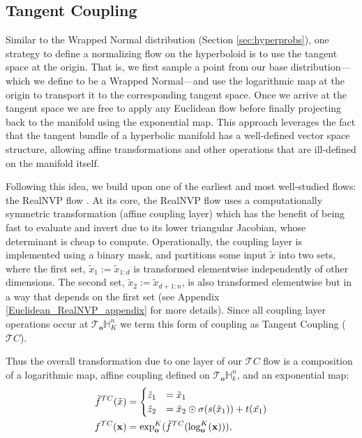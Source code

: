\subsection{Tangent Coupling}
Similar to the Wrapped Normal distribution (Section \ref{sec:hyperprobs}), one strategy to define a normalizing flow on the hyperboloid is to use the tangent space at the origin. That is, we first sample a point from our base distribution---which we define to be a Wrapped Normal---and use the logarithmic map at the origin to transport it to the corresponding tangent space. Once we arrive at the tangent space we are free to apply any Euclidean flow before finally projecting back to the manifold using the exponential map. 
This approach leverages the fact that the tangent bundle of a hyperbolic manifold has a well-defined vector space structure, allowing affine transformations and other operations that are ill-defined on the manifold itself. 

Following this idea, we build upon one of the earliest and most well-studied flows: the RealNVP flow \cite{dinh2016density}. At its core, the RealNVP flow uses a computationally symmetric transformation (affine coupling layer) which has the benefit of being fast to evaluate and invert due to its lower triangular Jacobian, whose determinant is cheap to compute. Operationally, the coupling layer is implemented using a binary mask, and partitions some input $\tilde{x}$ into two sets, where the first set, $\tilde{x}_1:=\tilde{x}_{1:d}$ is transformed elementwise independently of other dimensions. The second set, $\tilde{x}_2:=\tilde{x}_{d+1:n}$, is also transformed elementwise but in a way that depends on the first set (see Appendix \ref{Euclidean_RealNVP_appendix} for more details). Since all coupling layer operations occur at $\mathcal{T}_{\textbf{o}}\mathbb{H}^n_K$ we term this form of coupling as Tangent Coupling ($\mathcal{T}C$). 

Thus the overall transformation due to one layer of our $\mathcal{T}C$ flow is a composition of a logarithmic map, affine coupling defined on $\mathcal{T}_{\textbf{o}}\mathbb{H}^n_k$, and an exponential map:
\begin{align}
    \label{eq:tangent_coupling}
     \tilde{f}^{\mathcal{T}C}(\tilde{x}) &=
     \begin{cases}
     \tilde{z}_{1} &= \tilde{x}_{1} \\
     \tilde{z}_{2} &= \tilde{x}_{2} \odot \sigma(s(\tilde{x}_{1})) + t(\tilde{x_1}) \nonumber
     \end{cases}\\
    f^{\mathcal{T}C}(\mathbf{x}) &= \textnormal{exp}_{\textbf{o}}^K(\tilde{f}^{\mathcal{T}C}(\log_{\textbf{o}}^K(\textbf{x}))),
\end{align}

